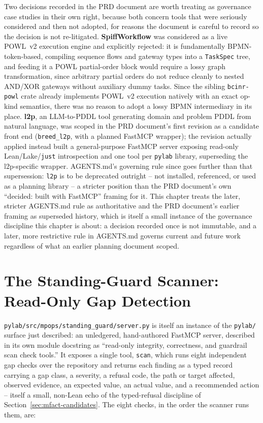 Two decisions recorded in the PRD document are worth treating as
governance case studies in their own right, because both concern tools
that were seriously considered and then not adopted, for reasons the
document is careful to record so the decision is not re-litigated.
\textbf{SpiffWorkflow} was considered as a live POWL~v2 execution engine
and explicitly rejected: it is fundamentally BPMN-token-based, compiling
sequence flows and gateway types into a \texttt{TaskSpec} tree, and
feeding it a POWL partial-order block would require a lossy graph
transformation, since arbitrary partial orders do not reduce cleanly to
nested AND/XOR gateways without auxiliary dummy tasks. Since the
sibling \texttt{bcinr-powl} crate already implements POWL~v2 execution
natively with an exact op-kind semantics, there was no reason to adopt a
lossy BPMN intermediary in its place. \textbf{l2p}, an LLM-to-PDDL tool
generating domain and problem PDDL from natural language, was scoped in
the PRD document's first revision as a candidate front end
(\texttt{breed\_l2p}, with a planned FastMCP wrapper); the revision
actually applied instead built a general-purpose FastMCP server exposing
read-only Lean/Lake/\texttt{just} introspection and one tool per
\texttt{pylab} library, superseding the l2p-specific wrapper. AGENTS.md's
governing rule since goes further than that supersession: \texttt{l2p} is
to be deprecated outright -- not installed, referenced, or used as a
planning library -- a stricter position than the PRD document's own
``decided: built with FastMCP'' framing for it. This chapter treats the
later, stricter AGENTS.md rule as authoritative and the PRD document's
earlier framing as superseded history, which is itself a small instance
of the governance discipline this chapter is about: a decision recorded
once is not immutable, and a later, more restrictive rule in AGENTS.md
governs current and future work regardless of what an earlier planning
document scoped.

\section{The Standing-Guard Scanner: Read-Only Gap Detection}
\label{sec:ai-standing-guard}

\texttt{pylab/src/mpops/standing\_guard/server.py} is itself an instance
of the \texttt{pylab/} surface just described: an unledgered,
hand-authored FastMCP server, described in its own module docstring as
``read-only integrity, correctness, and guardrail scan check tools.'' It
exposes a single tool, \texttt{scan}, which runs eight independent gap
checks over the repository and returns each finding as a typed record
carrying a gap class, a severity, a refusal code, the path or target
affected, observed evidence, an expected value, an actual value, and a
recommended action -- itself a small, non-Lean echo of the typed-refusal
discipline of Section~\ref{sec:mfact-candidates}. The eight checks, in
the order the scanner runs them, are:

